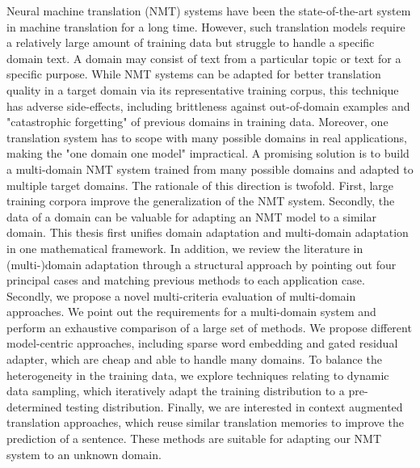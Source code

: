 Neural machine translation (NMT) systems have been the state-of-the-art system in machine translation for a long time. However, such translation models require a relatively large amount of training data but struggle to handle a specific domain text. A domain may consist of text from a particular topic or text for a specific purpose. While NMT systems can be adapted for better translation quality in a target domain via its representative training corpus, this technique has adverse side-effects, including brittleness against out-of-domain examples and "catastrophic forgetting" of previous domains in training data. Moreover, one translation system has to scope with many possible domains in real applications, making the "one domain one model" impractical. A promising solution is to build a multi-domain NMT system trained from many possible domains and adapted to multiple target domains. The rationale of this direction is twofold. First, large training corpora improve the generalization of the NMT system. Secondly, the data of a domain can be valuable for adapting an NMT model to a similar domain.
This thesis first unifies domain adaptation and multi-domain adaptation in one mathematical framework. In addition, we review the literature in (multi-)domain adaptation through a structural approach by pointing out four principal cases and matching previous methods to each application case. Secondly, we propose a novel multi-criteria evaluation of multi-domain approaches. We point out the requirements for a multi-domain system and perform an exhaustive comparison of a large set of methods. We propose different model-centric approaches, including sparse word embedding and gated residual adapter, which are cheap and able to handle many domains. To balance the heterogeneity in the training data, we explore techniques relating to dynamic data sampling, which iteratively adapt the training distribution to a pre-determined testing distribution. Finally, we are interested in context augmented translation approaches, which reuse similar translation memories to improve the prediction of a sentence. These methods are suitable for adapting our NMT system to an unknown domain.

